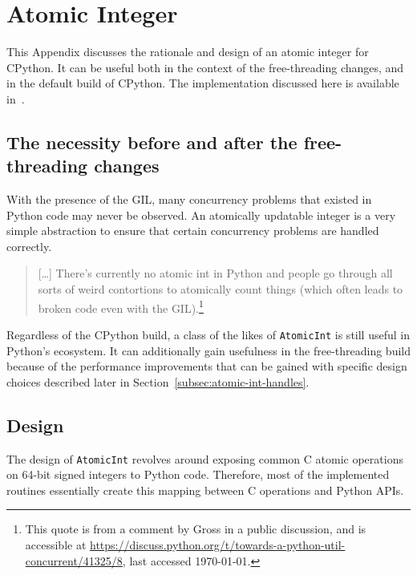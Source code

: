 \chapter{Atomic Integer}\label{ch:atomic-int}

This Appendix discusses the rationale and design of an atomic integer for CPython.
It can be useful both in the context of the free-threading changes, and in the default build of CPython.
The implementation discussed here is available in~\cite[src/cereggii/atomic\_int]{cereggii}.


\section[The necessity before and after the free-threading changes]{The necessity before and after the free-\\threading changes}\label{sec:the-necessity-before-and-after-the-free-threading-changes}

With the presence of the GIL, many concurrency problems that existed in Python code may never be observed.
An atomically updatable integer is a very simple abstraction to ensure that certain concurrency problems are handled correctly.

\begin{quote}
    [\ldots] There's currently no atomic int in Python and people go through all sorts of weird contortions to atomically count things (which often leads to broken code even with the GIL).\footnote{%
    This quote is from a comment by Gross in a public discussion, and is accessible at \url{https://discuss.python.org/t/towards-a-python-util-concurrent/41325/8}, last accessed \today.
}
\end{quote}

Regardless of the CPython build, a class of the likes of \texttt{AtomicInt} is still useful in Python's ecosystem.
It can additionally gain usefulness in the free-threading build because of the performance improvements that can be gained with specific design choices described later in Section~\ref{subsec:atomic-int-handles}.


\section{Design}\label{sec:atomic-int-design}

The design of \texttt{AtomicInt} revolves around exposing common C atomic operations on 64-bit signed integers to Python code.
Therefore, most of the implemented routines essentially create this mapping between C operations and Python APIs.

